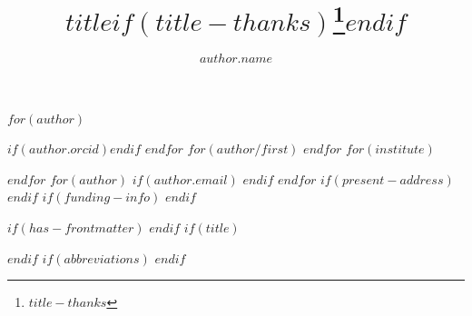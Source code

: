 \documentclass[
$if(fontsize)$
  $fontsize$,
$endif$
$if(papersize)$
  $papersize$paper,
$endif$
$for(classoption)$
  $classoption$$sep$,
$endfor$
]{MRM}
\begin{document}
\title{$title$$if(title-thanks)$\protect\thanks{$title-thanks$}$endif$}
$for(author)$
\author[$for(author.institute)$$author.institute$$sep$,$endfor$]{$author.name$}{$if(author.orcid)$$endif$}
$endfor$
$for(author/first)$
$endfor$
$for(institute)$
\address[$institute.index$]{$institute.name$}
$endfor$
$for(author)$
$if(author.email)$
$endif$
$endfor$
$if(present-address)$
$endif$
$if(funding-info)$
$endif$
\setlength{\adjtitleskip}{0pt} %

$if(has-frontmatter)$
\frontmatter
$endif$
$if(title)$
\maketitle
\clearpage
$endif$
$if(abbreviations)$
$endif$
\end{document}
